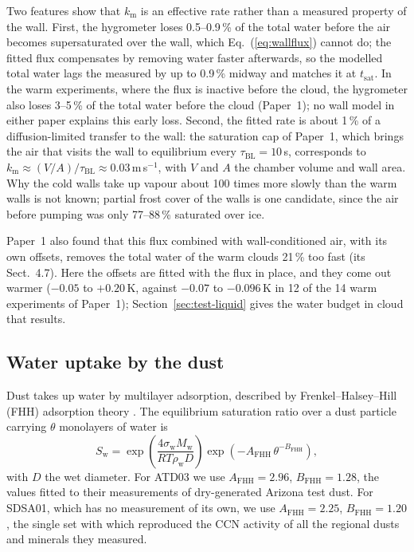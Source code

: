Two features show that $k_\mathrm{m}$ is an effective rate rather than a measured property of the wall. First, the hygrometer loses 0.5--0.9\,\% of the total water before the air becomes supersaturated over the wall, which Eq.~(\ref{eq:wallflux}) cannot do; the fitted flux compensates by removing water faster afterwards, so the modelled total water lags the measured by up to 0.9\,\% midway and matches it at $t_\mathrm{sat}$. In the warm experiments, where the flux is inactive before the cloud, the hygrometer also loses 3--5\,\% of the total water before the cloud (Paper~1); no wall model in either paper explains this early loss. Second, the fitted rate is about 1\,\% of a diffusion-limited transfer to the wall: the saturation cap of Paper~1, which brings the air that visits the wall to equilibrium every $\tau_\mathrm{BL} = 10$\,s, corresponds to $k_\mathrm{m} \approx (V/A)/\tau_\mathrm{BL} \approx 0.03$\,m\,s$^{-1}$, with $V$ and $A$ the chamber volume and wall area. Why the cold walls take up vapour about 100 times more slowly than the warm walls is not known; partial frost cover of the walls is one candidate, since the air before pumping was only 77--88\,\% saturated over ice. 

Paper~1 also found that this flux combined with wall-conditioned air, with its own offsets, removes the total water of the warm clouds 21\,\% too fast (its Sect.~4.7). Here the offsets are fitted with the flux in place, and they come out warmer ($-0.05$ to $+0.20$\,K, against $-0.07$ to $-0.096$\,K in 12 of the 14 warm experiments of Paper~1); Section~\ref{sec:test-liquid} gives the water budget in cloud that results.

\subsection{Water uptake by the dust}

Dust takes up water by multilayer adsorption, described by Frenkel--Halsey--Hill (FHH) adsorption theory \citep{Kumar2009,Kumar2011}. The equilibrium saturation ratio over a dust particle carrying $\theta$ monolayers of water is
\begin{equation}
  S_\mathrm{w} = \exp\!\left(\frac{4\sigma_\mathrm{w} M_\mathrm{w}}{R T \rho_\mathrm{w} D}\right)\exp\!\left(-A_\mathrm{FHH}\,\theta^{-B_\mathrm{FHH}}\right),
  \label{eq:fhh}
\end{equation}
with $D$ the wet diameter. For ATD03 we use $A_\mathrm{FHH} = 2.96$, $B_\mathrm{FHH} = 1.28$, the values \citet{Kumar2011} fitted to their measurements of dry-generated Arizona test dust. For SDSA01, which has no measurement of its own, we use $A_\mathrm{FHH} = 2.25$, $B_\mathrm{FHH} = 1.20$, the single set with which \citet{Kumar2011} reproduced the CCN activity of all the regional dusts and minerals they measured. 

